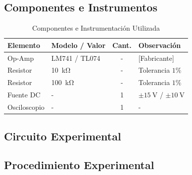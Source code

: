 \documentclass[conference]{IEEEtran}
\begin{document}
\subsection{Componentes e Instrumentos}
\begin{table}[htbp]
    \centering
    \caption{Componentes e Instrumentación Utilizada}
    \label{tab:componentes}
    \begin{tabular}{llcl}
        \toprule
        \textbf{Elemento} & \textbf{Modelo / Valor} & \textbf{Cant.} & \textbf{Observación} \\
        \midrule
        Op-Amp & LM741 / TL074 & - & [Fabricante] \\
        Resistor & \SI{10}{\kilo\ohm} & - & Tolerancia $1\%$ \\
        Resistor & \SI{100}{\kilo\ohm} & - & Tolerancia $1\%$ \\
        Fuente DC & - & 1 & $\pm\SI{15}{\volt}$ / $\pm\SI{10}{\volt}$ \\
        Osciloscopio & - & 1 & - \\
        \bottomrule
    \end{tabular}
\end{table}

\subsection{Circuito Experimental}
%

\subsection{Procedimiento Experimental}
\end{document}
